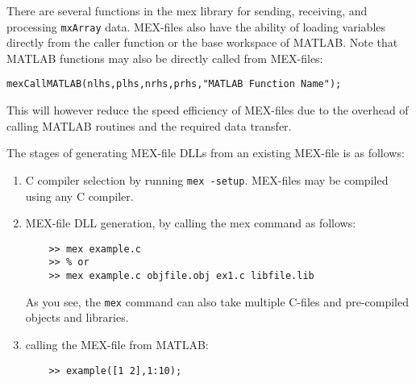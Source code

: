 \documentclass[10pt,a4paper]{article}
\newcounter{example}[section]
\begin{document}
There are several functions in the mex library for sending, receiving, and processing \texttt{mxArray} data. MEX-files also have the ability of loading variables directly from the caller function or the base workspace of MATLAB. Note that MATLAB functions may also be directly called from MEX-files:
\begin{lstlisting}
mexCallMATLAB(nlhs,plhs,nrhs,prhs,"MATLAB Function Name");
\end{lstlisting}
This will however reduce the speed efficiency of MEX-files due to the overhead of calling MATLAB routines and the required data transfer.

The stages of generating MEX-file DLLs from an existing MEX-file is as follows:
\begin{enumerate}
\item C compiler selection by running \texttt{mex -setup}. MEX-files may be compiled using any C compiler. %
\item MEX-file DLL generation, by calling the mex command as follows:
\begin{lstlisting}
	>> mex example.c
	>> % or
	>> mex example.c objfile.obj ex1.c libfile.lib
\end{lstlisting}
As you see, the \texttt{mex} command can also take multiple C-files and pre-compiled objects and libraries.
\item calling the MEX-file from MATLAB:
\begin{lstlisting}
	>> example([1 2],1:10);
\end{lstlisting}
\end{enumerate}
\end{document}

